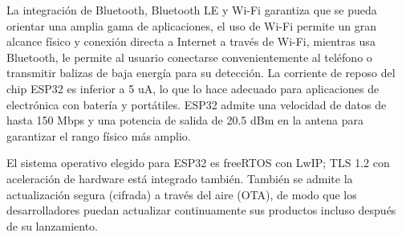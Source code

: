 La integración de Bluetooth, Bluetooth LE y Wi-Fi garantiza que se pueda orientar una amplia gama de aplicaciones, el uso de Wi-Fi permite un gran alcance físico y conexión directa a Internet a través de Wi-Fi, mientras usa Bluetooth, le permite al usuario conectarse convenientemente al teléfono o transmitir balizas de baja energía para su detección. La corriente de reposo del chip ESP32 es inferior a 5 uA, lo que lo hace adecuado para aplicaciones de electrónica con batería y portátiles. ESP32 admite una velocidad de datos de hasta 150 Mbps y una potencia de salida de 20.5 dBm en la antena para garantizar el rango físico más amplio.

El sistema operativo elegido para ESP32 es freeRTOS con LwIP; TLS 1.2 con aceleración de hardware está integrado también. También se admite la actualización segura (cifrada) a través del aire (OTA), de modo que los desarrolladores puedan actualizar continuamente sus productos incluso después de su lanzamiento.

\begin{comment}
 is a powerful, generic Wi-Fi+BT+BLE MCU module that targets a wide variety of applications, ranging from low-power sensor networks to the most demanding tasks, such as voice encoding, music streaming and MP3 decoding.

At the core of this module is the ESP32-D0WDQ6 chip*. The chip embedded is designed to be scalable and adaptive. There are two CPU cores that can be individually controlled, and the clock frequency is adjustable from 80 MHz to 240 MHz. The user may also power off the CPU and make use of the low-power co-processor to constantly monitor the peripherals for changes or crossing of thresholds. ESP32 integrates a rich set of peripherals, ranging from capacitive touch sensors, Hall sensors, SD card interface, Ethernet, high-speed SPI, UART, I2S and I2C.

The integration of Bluetooth, Bluetooth LE and Wi-Fi ensures that a wide range of applications can be targeted, and that the module is future proof: using Wi-Fi allows a large physical range and direct connection to the internet through a Wi-Fi router, while using Bluetooth allows the user to conveniently connect to the phone or broadcast low energy beacons for its detection. The sleep current of the ESP32 chip is less than 5

A, making it suitable for battery powered and wearable electronics applications. ESP32 supports a data rate of up to 150 Mbps, and 20.5 dBm output power at the antenna to ensure the widest physical range. As such the chip does offer industry-leading specifications and the best performance for electronic integration, range, power consumption, and connectivity.

The operating system chosen for ESP32 is freeRTOS with LwIP; TLS 1.2 with hardware acceleration is built in as well. Secure (encrypted) over the air (OTA) upgrade is also supported, so that developers can continually upgrade their products even after their release.
\end{comment}


